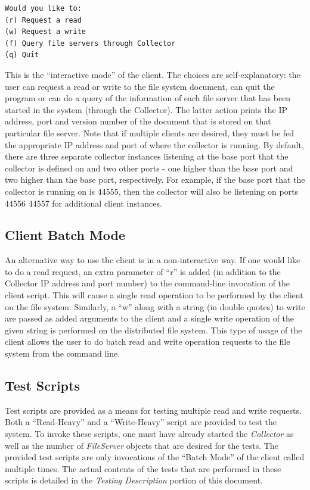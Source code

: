 \documentclass
[english,a4paper]{article}
\begin{document}
\begin{verbatim}
Would you like to:
(r) Request a read
(w) Request a write
(f) Query file servers through Collector
(q) Quit
\end{verbatim}

This is the ``interactive mode''  of the client. The choices are
self-explanatory: the user can request a read or write to the file
system document, can quit the program or can do a query of the
information of each file server that has been started in the system
(through the Collector). The latter action prints the IP address, port
and version number of the document that is stored on that particular
file server. Note that if multiple clients are desired, they must be
fed the appropriate IP address and port of where the collector is
running. By default, there are three separate collector instances
listening at the base port that the collector is defined on and two
other ports - one higher than the base port and two higher than the
base port, respectively. For example, if the base port that the
collector is running on is 44555, then the collector will also be
listening on ports 44556 44557 for additional client instances.

\subsection{Client Batch Mode}
An alternative way to use the client is in a non-interactive way. If one would like to do a read request, an extra parameter of ``r'' is added (in addition to the Collector IP address and port number) to the command-line invocation of the client script. This will cause a single read operation to be performed by the client on the file system. Similarly, a ``w'' along with a string (in double quotes) to write are passed as added arguments to the client and a single write operation of the given string is performed on the distributed file system. This type of usage of the client allows the user to do batch read and write operation requests to the file system from the command line.

\subsection{Test Scripts}
Test scripts are provided as a means for testing multiple read and
write requests. Both a ``Read-Heavy'' and a ``Write-Heavy'' script are
provided to test the system. To invoke these scripts, one must have
already started the \emph{Collector} as well as the number of
\emph{FileServer} objects that are desired for the tests. The provided
test scripts are only invocations of the ``Batch Mode'' of the client
called multiple times. The actual contents of the tests
that are performed in these scripts is detailed in the \emph{Testing
  Description} portion of this document.
\end{document}

